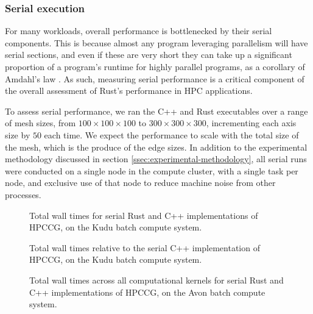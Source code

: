 \subsubsection{Serial execution}
\label{sssec:serial-execution}

For many workloads, overall performance is bottlenecked by their serial components. This is because almost any program leveraging parallelism will have serial sections, and even if these are very short they can take up a significant proportion of a program's runtime for highly parallel programs, as a corollary of Amdahl's law \cite{amdahlsLaw}. As such, measuring serial performance is a critical component of the overall assessment of Rust's performance in \acrshort{HPC} applications.

To assess serial performance, we ran the C++ and Rust executables over a range of mesh sizes, from $100 \times 100 \times 100$ to $300 \times 300 \times 300$, incrementing each axis size by $50$ each time. We expect the performance to scale with the total size of the mesh, which is the produce of the edge sizes. In addition to the experimental methodology discussed in section \ref{ssec:experimental-methodology}, all serial runs were conducted on a single node in the compute cluster, with a single task per node, and exclusive use of that node to reduce machine noise from other processes.

\begin{figure}[H]
    \centering
    
    \vspace*{-0.5cm}
    \caption{Total wall times for serial Rust and C++ implementations of HPCCG, on the Kudu batch compute system.}
    \label{fig:1_serial_line}
\end{figure}

\begin{figure}[H]
    \centering
    
    \vspace*{-0.5cm}
    \caption{Total wall times relative to the serial C++ implementation of HPCCG, on the Kudu batch compute system.}
    \label{fig:2_serial_line_relative}
\end{figure}

\begin{figure}[H]
    \centering
    
    \vspace*{-0.5cm}
    \caption{Total wall times across all computational kernels for serial Rust and C++ implementations of HPCCG, on the Avon batch compute system.}
    \label{fig:1_serial_line_avon}
\end{figure}


